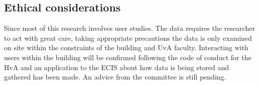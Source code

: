 \subsection{Ethical considerations}

Since most of this research involves user studies. The data requires the researcher
to act with great care, taking appropriate precautions the data is only examined on site within the constraints of the building and UvA faculty. Interacting with users within the building will be confirmed following the code of conduct for the HvA and an application to the ECIS about how data is being stored and gathered has been made. An advice from the committee is still pending.